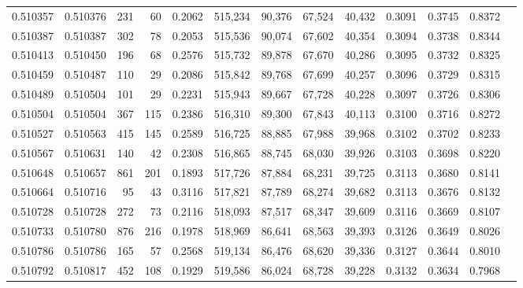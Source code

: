 \begin{tabular}{rrrrrrrrrrrrr}
0.510357 & 0.510376 &   231 &    60 &                                     0.2062 & 515,234 &  90,376 &  67,524 &  40,432 & 0.3091 & 0.3745 & 0.8372 \\
0.510387 & 0.510387 &   302 &    78 &                                     0.2053 & 515,536 &  90,074 &  67,602 &  40,354 & 0.3094 & 0.3738 & 0.8344 \\
0.510413 & 0.510450 &   196 &    68 &                                     0.2576 & 515,732 &  89,878 &  67,670 &  40,286 & 0.3095 & 0.3732 & 0.8325 \\
0.510459 & 0.510487 &   110 &    29 &                                     0.2086 & 515,842 &  89,768 &  67,699 &  40,257 & 0.3096 & 0.3729 & 0.8315 \\
0.510489 & 0.510504 &   101 &    29 &                                     0.2231 & 515,943 &  89,667 &  67,728 &  40,228 & 0.3097 & 0.3726 & 0.8306 \\
0.510504 & 0.510504 &   367 &   115 &                                     0.2386 & 516,310 &  89,300 &  67,843 &  40,113 & 0.3100 & 0.3716 & 0.8272 \\
0.510527 & 0.510563 &   415 &   145 &                                     0.2589 & 516,725 &  88,885 &  67,988 &  39,968 & 0.3102 & 0.3702 & 0.8233 \\
0.510567 & 0.510631 &   140 &    42 &                                     0.2308 & 516,865 &  88,745 &  68,030 &  39,926 & 0.3103 & 0.3698 & 0.8220 \\
0.510648 & 0.510657 &   861 &   201 &                                     0.1893 & 517,726 &  87,884 &  68,231 &  39,725 & 0.3113 & 0.3680 & 0.8141 \\
0.510664 & 0.510716 &    95 &    43 &                                     0.3116 & 517,821 &  87,789 &  68,274 &  39,682 & 0.3113 & 0.3676 & 0.8132 \\
0.510728 & 0.510728 &   272 &    73 &                                     0.2116 & 518,093 &  87,517 &  68,347 &  39,609 & 0.3116 & 0.3669 & 0.8107 \\
0.510733 & 0.510780 &   876 &   216 &                                     0.1978 & 518,969 &  86,641 &  68,563 &  39,393 & 0.3126 & 0.3649 & 0.8026 \\
0.510786 & 0.510786 &   165 &    57 &                                     0.2568 & 519,134 &  86,476 &  68,620 &  39,336 & 0.3127 & 0.3644 & 0.8010 \\
0.510792 & 0.510817 &   452 &   108 &                                     0.1929 & 519,586 &  86,024 &  68,728 &  39,228 & 0.3132 & 0.3634 & 0.7968 \\

\end{tabular}
